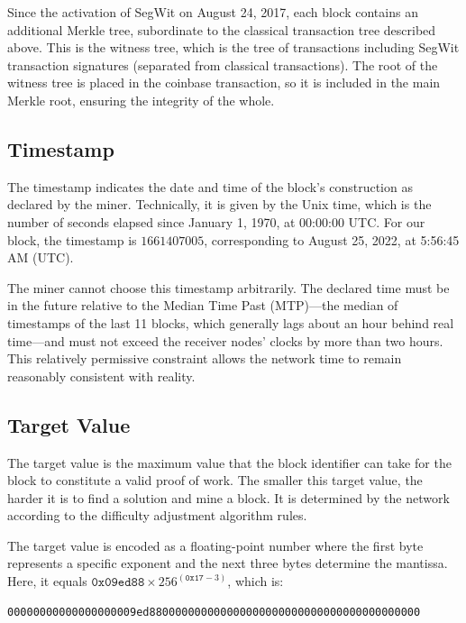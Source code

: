 \documentclass[
  a5paper,
  smalldemyvopaper,10pt,twoside,onecolumn,openright,extrafontsizes,hidelinks]{memoir}
\begin{document}
Since the activation of SegWit on August 24, 2017, each block contains
an additional Merkle tree, subordinate to the classical transaction tree
described above. This is the witness tree, which is the tree of
transactions including SegWit transaction signatures (separated from
classical transactions). The root of the witness tree is placed in the
coinbase transaction, so it is included in the main Merkle root,
ensuring the integrity of the whole.

\subsection{Timestamp}\label{timestamp}

The timestamp indicates the date and time of the block's construction as
declared by the miner. Technically, it is given by the Unix time, which
is the number of seconds elapsed since January 1, 1970, at 00:00:00 UTC.
For our block, the timestamp is \(1661407005\), corresponding to August
25, 2022, at 5:56:45 AM (UTC).

The miner cannot choose this timestamp arbitrarily. The declared time
must be in the future relative to the Median Time Past (MTP)---the
median of timestamps of the last 11 blocks, which generally lags about
an hour behind real time---and must not exceed the receiver nodes'
clocks by more than two hours. This relatively permissive constraint
allows the network time to remain reasonably consistent with reality.

\subsection{Target Value}\label{target-value}

The target value is the maximum value that the block identifier can take
for the block to constitute a valid proof of work. The smaller this
target value, the harder it is to find a solution and mine a block. It
is determined by the network according to the difficulty adjustment
algorithm rules.

The target value is encoded as a floating-point number where the first
byte represents a specific exponent and the next three bytes determine
the mantissa. Here, it equals
\(\mathtt{0x09ed88} \times 256^{(\mathtt{0x17} - 3)}\), which is:

\begin{verbatim}
00000000000000000009ed880000000000000000000000000000000000000000
\end{verbatim}
\end{document}
